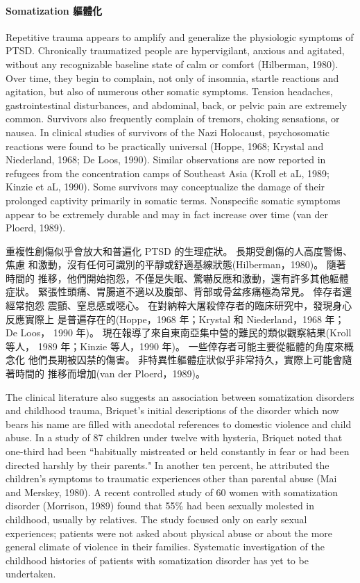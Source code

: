 \documentclass[12pt]{article}
\begin{document}
\paragraph{Somatization 軀體化}
    Repetitive trauma appears to amplify and generalize the physiologic
    symptoms of PTSD. Chronically traumatized people are hypervigilant, anxious
    and agitated, without any recognizable baseline state of calm or comfort
    (Hilberman, 1980). Over time, they begin to complain, not only of insomnia,
    startle reactions and agitation, but also of numerous other somatic
    symptoms. Tension headaches, gastrointestinal disturbances, and abdominal,
    back, or pelvic pain are extremely common. Survivors also frequently
    complain of tremors, choking sensations, or nausea. In clinical studies of
    survivors of the Nazi Holocaust, psychosomatic reactions were found to be
    practically universal (Hoppe, 1968; Krystal and Niederland, 1968; De Loos,
    1990). Similar observations are now reported in refugees from the
    concentration camps of Southeast Asia (Kroll et aL, 1989; Kinzie et aL,
    1990). Some survivors may conceptualize the damage of their prolonged
    captivity primarily in somatic terms. Nonspecific somatic symptoms appear
    to be extremely durable and may in fact increase over time (van der Ploerd,
    1989).

    重複性創傷似乎會放大和普遍化 PTSD 的生理症狀。 長期受創傷的人高度警惕、焦慮
    和激動，沒有任何可識別的平靜或舒適基線狀態(Hilberman，1980)。 隨著時間的
    推移，他們開始抱怨，不僅是失眠、驚嚇反應和激動，還有許多其他軀體症狀。
    緊張性頭痛、胃腸道不適以及腹部、背部或骨盆疼痛極為常見。 倖存者還經常抱怨
    震顫、窒息感或噁心。 在對納粹大屠殺倖存者的臨床研究中，發現身心反應實際上
    是普遍存在的(Hoppe，1968 年；Krystal 和 Niederland，1968 年；De Loos，
    1990 年)。 現在報導了來自東南亞集中營的難民的類似觀察結果(Kroll 等人，
    1989 年；Kinzie 等人，1990 年)。 一些倖存者可能主要從軀體的角度來概念化
    他們長期被囚禁的傷害。 非特異性軀體症狀似乎非常持久，實際上可能會隨著時間的
    推移而增加(van der Ploerd，1989)。

    The clinical literature also suggests an association between somatization
    disorders and childhood trauma, Briquet's initial descriptions of the
    disorder which now bears his name are filled with anecdotal references to
    domestic violence and child abuse. In a study of 87 children under twelve
    with hysteria, Briquet noted that one-third had been ``habitually
    mistreated or held constantly in fear or had been directed harshly by their
    parents." In another ten percent, he attributed the children's symptoms to
    traumatic experiences other than parental abuse (Mai and Merskey, 1980). A
    recent controlled study of 60 women with somatization disorder (Morrison,
    1989) found that 55\% had been sexually molested in childhood, usually by
    relatives. The study focused only on early sexual experiences; patients
    were not asked about physical abuse or about the more general climate of
    violence in their families. Systematic investigation of the childhood
    histories of patients with somatization disorder has yet to be undertaken.
\end{document}
